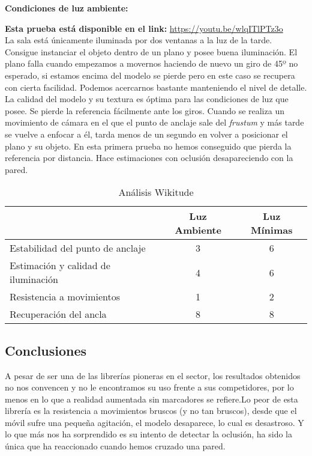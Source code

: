 \textbf{Condiciones de luz ambiente:}

\textbf{Esta prueba está disponible en el link:} \url{https://youtu.be/wlqITlPTz3o}\\

La sala está únicamente iluminada por dos ventanas a la luz de la tarde.\\

Consigue instanciar el objeto dentro de un plano y posee buena iluminación. El plano falla cuando empezamos a movernos haciendo de nuevo un giro de 45º no esperado, si estamos encima del modelo se pierde pero en este caso se recupera con cierta facilidad. Podemos acercarnos bastante manteniendo el nivel de detalle. La calidad del modelo y su textura es óptima para las condiciones de luz que posee. Se pierde la referencia fácilmente ante los giros. Cuando se realiza un movimiento de cámara en el que el punto de anclaje sale del \textit{frustum} y más tarde se vuelve a enfocar a él, tarda menos de un segundo en volver a posicionar el plano y su objeto. En esta primera prueba no hemos conseguido que pierda la referencia por distancia. Hace estimaciones con oclusión desapareciendo con la pared.

\begin{table}[H]
    \centering
    \begin{tabular}{|l|c|c|}
    \hline
          & Luz Ambiente & Luz Mínimas \\
         \hline
        Estabilidad del punto de anclaje   &3 &6\\
        \hline
        Estimación y calidad de iluminación  &4 &6 \\
        \hline
        Resistencia a movimientos  &1 &2 \\
        \hline
        Recuperación del ancla  &8 &8 \\
      \hline
    \end{tabular}
    \caption{Análisis Wikitude}
    \label{tab:TWikitude}
\end{table}

\subsection{Conclusiones}
A pesar de ser una de las librerías pioneras en el sector, los resultados obtenidos no nos convencen y no le encontramos su uso frente a sus competidores, por lo menos en lo que a realidad aumentada sin marcadores se refiere.Lo peor de esta librería es la resistencia a movimientos bruscos (y no tan bruscos), desde que el móvil sufre una pequeña agitación, el modelo desaparece, lo cual es desastroso. Y lo que más nos ha sorprendido es su intento de detectar la oclusión, ha sido la única que ha reaccionado cuando hemos cruzado una pared.
\clearpage
